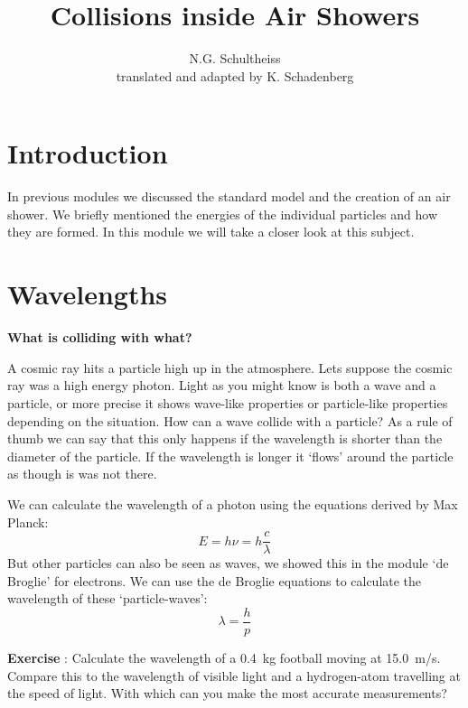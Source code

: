



\author{N.G. Schultheiss \\ translated and adapted by K. Schadenberg}
\date{}
\title{Collisions inside Air Showers}



\maketitle

\section{Introduction}
In previous modules we discussed the standard model and the creation of an air shower. We briefly mentioned the energies of the individual particles and how they are formed. In this module we will take a closer look at this subject.

\section{Wavelengths}
\textbf{What is colliding with what?}

A cosmic ray hits a particle high up in the atmosphere. Lets suppose the cosmic ray was a high energy photon. Light as you might know is both a wave and a particle, or more precise it shows wave-like properties or particle-like properties depending on the situation. How can a wave collide with a particle? As a rule of thumb we can say that this only happens if the wavelength is shorter than the diameter of the particle. If the wavelength is longer it `flows' around the particle as though is was not there.

We can calculate the wavelength of a photon using the equations derived by Max Planck:
\begin{equation}
E=h \nu = h \frac{c}{\lambda}
\end{equation}
But other particles can also be seen as waves, we showed this in the module `de Broglie' for electrons. We can use the de Broglie equations to calculate the wavelength of these `particle-waves':
\begin{equation}
\lambda = \frac{h}{p} \label{eq:broglie}
\end{equation}

\begin{shaded}
\textbf{Exercise \theExercise {}} : Calculate the wavelength of a 0.4~kg football moving at 15.0~m/s. Compare this to the wavelength of visible light and a hydrogen-atom travelling at the speed of light. With which can you make the most accurate measurements?\end{shaded}

